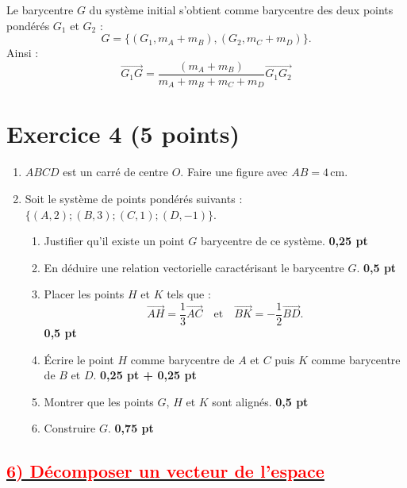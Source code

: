 \documentclass{article}
\begin{document}
   Le barycentre \( G \) du système initial s’obtient comme barycentre des deux points pondérés \( G_1 \) et \( G_2 \) :  
   \[
   G = \{(G_{1}, m_A + m_B), (G_{2}, m_C + m_D)\}.
   \]
   Ainsi :  
   \[
   \overrightarrow{G_{1}G} = \frac{(m_A + m_B) }{m_A + m_B+m_C + m_D}\overrightarrow{G_{1}G_{2}}
   \]

\section*{Exercice 4 \hfill (5 points)}

\begin{enumerate}
    \item $ABCD$ est un carré de centre $O$. Faire une figure avec $AB = 4 \, \text{cm}$.
    
    \item Soit le système de points pondérés suivants : $\{(A, 2); (B, 3); (C, 1); (D, -1)\}$.
    \begin{enumerate}
        \item Justifier qu’il existe un point $G$ barycentre de ce système. \hfill \textbf{0,25 pt}
        
        \item En déduire une relation vectorielle caractérisant le barycentre $G$. \hfill \textbf{0,5 pt}
        
        \item Placer les points $H$ et $K$ tels que :
        \[
        \overrightarrow{AH} = \frac{1}{3} \overrightarrow{AC} \quad \text{et} \quad \overrightarrow{BK} = -\frac{1}{2} \overrightarrow{BD}.
        \]
        \hfill \textbf{0,5 pt}
        
        \item Écrire le point $H$ comme barycentre de $A$ et $C$ puis $K$ comme barycentre de $B$ et $D$. \hfill \textbf{0,25 pt + 0,25 pt}
        
        \item Montrer que les points $G$, $H$ et $K$ sont alignés. \hfill \textbf{0,5 pt}
        
        \item Construire $G$. \hfill \textbf{0,75 pt}
    \end{enumerate}
\end{enumerate}

\subsection*{\underline{\textbf{\textcolor{red}{6) Décomposer un vecteur de l’espace}}}}
\end{document}
